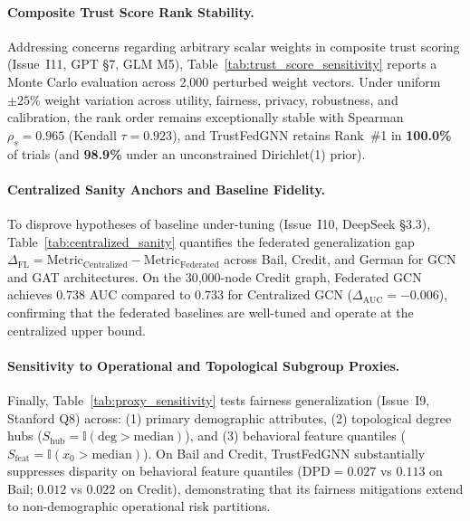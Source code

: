 \documentclass[pdflatex,sn-mathphys-num]{sn-jnl}
\theoremstyle{thmstyleone}%
\theoremstyle{thmstyletwo}%
\theoremstyle{thmstylethree}%
\begin{document}


\paragraph{Composite Trust Score Rank Stability.}
Addressing concerns regarding arbitrary scalar weights in composite trust scoring (Issue~I11, GPT §7, GLM M5), Table~\ref{tab:trust_score_sensitivity} reports a Monte Carlo evaluation across 2,000 perturbed weight vectors. Under uniform $\pm 25\%$ weight variation across utility, fairness, privacy, robustness, and calibration, the rank order remains exceptionally stable with Spearman $\rho_s = 0.965$ (Kendall $\tau = 0.923$), and TrustFedGNN retains Rank~\#1 in \textbf{100.0\%} of trials (and \textbf{98.9\%} under an unconstrained Dirichlet(1) prior).



\paragraph{Centralized Sanity Anchors and Baseline Fidelity.}
To disprove hypotheses of baseline under-tuning (Issue~I10, DeepSeek §3.3), Table~\ref{tab:centralized_sanity} quantifies the federated generalization gap $\Delta_{\mathrm{FL}} = \mathrm{Metric}_{\mathrm{Centralized}} - \mathrm{Metric}_{\mathrm{Federated}}$ across Bail, Credit, and German for GCN and GAT architectures. On the 30,000-node Credit graph, Federated GCN achieves $0.738$ AUC compared to $0.733$ for Centralized GCN ($\Delta_{\mathrm{AUC}} = -0.006$), confirming that the federated baselines are well-tuned and operate at the centralized upper bound.



\paragraph{Sensitivity to Operational and Topological Subgroup Proxies.}
Finally, Table~\ref{tab:proxy_sensitivity} tests fairness generalization (Issue~I9, Stanford Q8) across: (1) primary demographic attributes, (2) topological degree hubs ($S_{\mathrm{hub}} = \mathbb{I}(\mathrm{deg} > \mathrm{median})$), and (3) behavioral feature quantiles ($S_{\mathrm{feat}} = \mathbb{I}(x_0 > \mathrm{median})$). On Bail and Credit, TrustFedGNN substantially suppresses disparity on behavioral feature quantiles ($\mathrm{DPD} = 0.027$ vs $0.113$ on Bail; $0.012$ vs $0.022$ on Credit), demonstrating that its fairness mitigations extend to non-demographic operational risk partitions.
\end{document}
